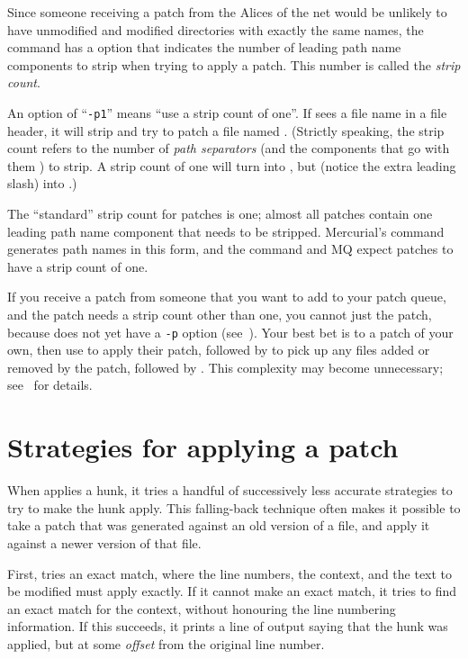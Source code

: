 Since someone receiving a patch from the Alices of the net would be
unlikely to have unmodified and modified directories with exactly the
same names, the  command has a 
option that indicates the number of leading path name components to
strip when trying to apply a patch.  This number is called the
\emph{strip count}.

An option of ``\texttt{-p1}'' means ``use a strip count of one''.  If
 sees a file name  in a file
header, it will strip  and try to patch a file named
.  (Strictly speaking, the strip count refers to the
number of \emph{path separators} (and the components that go with them
) to strip.  A strip count of one will turn  into
, but  (notice the extra leading
slash) into .)

The ``standard'' strip count for patches is one; almost all patches
contain one leading path name component that needs to be stripped.
Mercurial's  command generates path names in this form,
and the  command and MQ expect patches to have a strip
count of one.

If you receive a patch from someone that you want to add to your patch
queue, and the patch needs a strip count other than one, you cannot
just  the patch, because  does not yet
have a \texttt{-p} option (see~).  Your best bet is to
 a patch of your own, then use 
to apply their patch, followed by  to pick up any
files added or removed by the patch, followed by .
This complexity may become unnecessary; see~ for details.
\section{Strategies for applying a patch}

When  applies a hunk, it tries a handful of
successively less accurate strategies to try to make the hunk apply.
This falling-back technique often makes it possible to take a patch
that was generated against an old version of a file, and apply it
against a newer version of that file.

First,  tries an exact match, where the line numbers,
the context, and the text to be modified must apply exactly.  If it
cannot make an exact match, it tries to find an exact match for the
context, without honouring the line numbering information.  If this
succeeds, it prints a line of output saying that the hunk was applied,
but at some \emph{offset} from the original line number.

